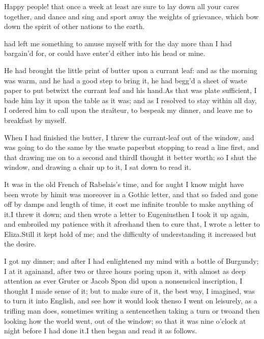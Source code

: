 \documentclass[twoside]{article}
\begin{document}
Happy people! that once a week at least
are sure to lay down all your cares
together, and dance and sing and sport
away the weights of grievance, which bow
down the spirit of other nations to the
earth.





\vskip 6pt


 had left me something
to amuse myself with for the day more than
I had bargain’d for, or could have enter’d
either into his head or mine.

He had brought the little print of butter
upon a currant leaf: and as the morning
was warm, and he had a good step to bring
it, he had begg’d a sheet of waste paper
to put betwixt the currant leaf and his
hand.\tskk As that was plate sufficient, I
bade him lay it upon the table as it was;
and as I resolved to stay within all day,
I ordered him to call upon the
\i{traîteur}, to bespeak my dinner, and
leave me to breakfast by myself.

When I had finished the butter, I threw
the currant-leaf out of the window, and
was going to do the same by the waste
paper\tskk but stopping to read a line
first, and that drawing me on to a second
and third\tskk I thought it better worth;
so I shut the window, and drawing a chair
up to it, I sat down to read it.

It was in the old French of Rabelais’s
time, and for aught I know might have been
wrote by him\tskk it was moreover in a
Gothic letter, and that so faded and gone
off by damps and length of time, it cost
me infinite trouble to make anything of
it.\tskk I threw it down; and then wrote a
letter to Eugenius\tskk then I took it up
again, and embroiled my patience with it
afresh\tskk and then to cure that, I
wrote a letter to Eliza.\tskk Still it
kept hold of me; and the difficulty of
understanding it increased but the desire.

I got my dinner; and after I had
enlightened my mind with a bottle of
Burgundy; I at it again\tskk and, after
two or three hours poring upon it, with
almost as deep attention as ever Gruter or
Jacob Spon did upon a nonsensical
inscription, I thought I made sense of it;
but to make sure of it, the best way, I
imagined, was to turn it into English, and
see how it would look then\tskk so I went
on leisurely, as a trifling man does,
sometimes writing a sentence\tskk then
taking a turn or two\tskk and then
looking how the world went, out of the
window; so that it was nine o’clock at
night before I had done it.\tskk I then
began and read it as follows.
\end{document}

